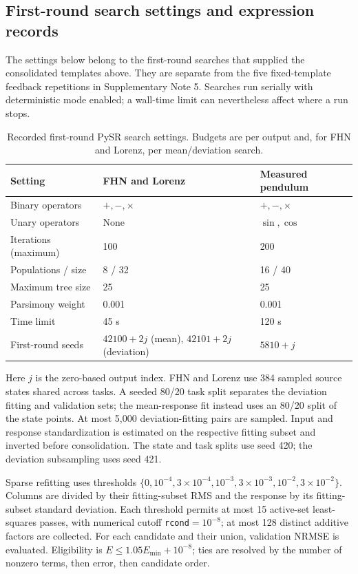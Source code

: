 \subsection*{First-round search settings and expression records}
\label{supp:search_records}

The settings below belong to the first-round searches that supplied the consolidated templates above. They are separate from the five fixed-template feedback repetitions in Supplementary Note 5. Searches run serially with deterministic mode enabled; a wall-time limit can nevertheless affect where a run stops.

\begin{table}[!ht]
\centering\small
\caption{Recorded first-round PySR search settings. Budgets are per output and, for FHN and Lorenz, per mean/deviation search.}
\label{tab:search_settings}
\begin{tabularx}{\textwidth}{@{}lXX@{}}
\toprule
Setting & FHN and Lorenz & Measured pendulum\\
\midrule
Binary operators & $+,-,\times$ & $+,-,\times$\\
Unary operators & None & $\sin,\cos$\\
Iterations (maximum) & 100 & 200\\
Populations / size & 8 / 32 & 16 / 40\\
Maximum tree size & 25 & 25\\
Parsimony weight & 0.001 & 0.001\\
Time limit & 45 s & 120 s\\
First-round seeds & $42100+2j$ (mean), $42101+2j$ (deviation) & $5810+j$\\
\bottomrule
\end{tabularx}
\end{table}

Here $j$ is the zero-based output index. FHN and Lorenz use 384 sampled source states shared across tasks. A seeded 80/20 task split separates the deviation fitting and validation sets; the mean-response fit instead uses an 80/20 split of the state points. At most 5,000 deviation-fitting pairs are sampled. Input and response standardization is estimated on the respective fitting subset and inverted before consolidation. The state and task splits use seed 420; the deviation subsampling uses seed 421.

Sparse refitting uses thresholds $\{0,10^{-4},3\times10^{-4},10^{-3},3\times10^{-3},10^{-2},3\times10^{-2}\}$. Columns are divided by their fitting-subset RMS and the response by its fitting-subset standard deviation. Each threshold permits at most 15 active-set least-squares passes, with numerical cutoff \texttt{rcond}$=10^{-8}$; at most 128 distinct additive factors are collected. For each candidate and their union, validation NRMSE is evaluated. Eligibility is $E\leq1.05E_{\min}+10^{-8}$; ties are resolved by the number of nonzero terms, then error, then candidate order.

